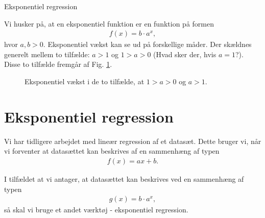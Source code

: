 \begin{center}
\Huge
Eksponentiel regression
\end{center}
Vi husker på, at en eksponentiel funktion er en funktion på formen
\begin{align*}
f(x) = b\cdot a^x,
\end{align*}
hvor $a,b>0.$ Eksponentiel vækst kan se ud på forskellige måder. Der skældnes generelt mellem to tilfælde: $a>1$ og $1>a>0$ (Hvad sker der, hvis $a=1$?). Disse to tilfælde fremgår af Fig. \ref{fig:eksp}.
\begin{figure}[H]
\centering
{}
\caption{Eksponentiel vækst i de to tilfælde, at $1>a>0$ og $a>1$.}
\label{fig:eksp}
\end{figure}

\section*{Eksponentiel regression}

Vi har tidligere arbejdet med lineær regression af et datasæt. Dette bruger vi, når vi forventer at datasættet kan beskrives af en sammenhæng af typen
\begin{align*}
	f(x) = ax+b.
\end{align*}

I tilfældet at vi antager, at datasættet kan beskrives ved en sammenhæng af typen 
\begin{align*}
	g(x) = b\cdot a^x, 
\end{align*}
så skal vi bruge et andet værktøj - eksponentiel regression. 


